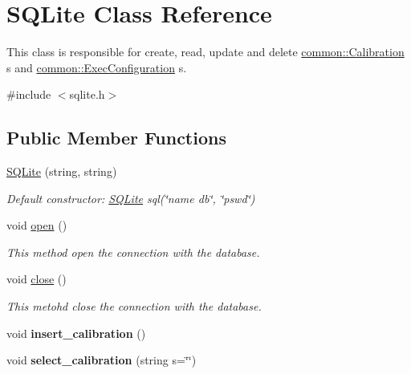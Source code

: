 \hypertarget{classSQLite}{}\section{S\+Q\+Lite Class Reference}
\label{classSQLite}


This class is responsible for create, read, update and delete \hyperlink{structcommon_1_1Calibration}{common\+::\+Calibration} \textquotesingle{}s and \hyperlink{structcommon_1_1ExecConfiguration}{common\+::\+Exec\+Configuration} \textquotesingle{}s.  




{\ttfamily \#include $<$sqlite.\+h$>$}

\subsection*{Public Member Functions}
\begin{DoxyCompactItemize}
\item 
\hyperlink{classSQLite_aec016ee26d918bb715383b7578118166}{S\+Q\+Lite} (string, string)\hypertarget{classSQLite_aec016ee26d918bb715383b7578118166}{}\label{classSQLite_aec016ee26d918bb715383b7578118166}

\begin{DoxyCompactList}\small\item\em Default constructor\+: \hyperlink{classSQLite}{S\+Q\+Lite} sql(\char`\"{}name db\char`\"{}, \char`\"{}pswd\char`\"{}) \end{DoxyCompactList}\item 
void \hyperlink{classSQLite_a2ba6d61d356aac7b2a0d7323ba997279}{open} ()
\begin{DoxyCompactList}\small\item\em This method open the connection with the database. \end{DoxyCompactList}\item 
void \hyperlink{classSQLite_aac5338faf7580f6adb3560c91d58b54a}{close} ()\hypertarget{classSQLite_aac5338faf7580f6adb3560c91d58b54a}{}\label{classSQLite_aac5338faf7580f6adb3560c91d58b54a}

\begin{DoxyCompactList}\small\item\em This metohd close the connection with the database. \end{DoxyCompactList}\item 
void {\bfseries insert\+\_\+calibration} ()\hypertarget{classSQLite_ae145e41fed72678f0e2900ec093ad323}{}\label{classSQLite_ae145e41fed72678f0e2900ec093ad323}

\item 
void {\bfseries select\+\_\+calibration} (string s=\char`\"{}\char`\"{})\hypertarget{classSQLite_aeb720971a449cc51d124251fa995cb5c}{}\label{classSQLite_aeb720971a449cc51d124251fa995cb5c}

\end{DoxyCompactItemize}
